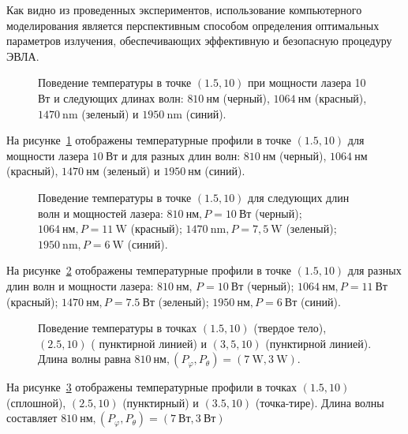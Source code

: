 Как видно из проведенных экспериментов, использование компьютерного
моделирования является перспективным способом определения оптимальных
параметров излучения, обеспечивающих эффективную и безопасную процедуру ЭВЛА.


\begin{figure}[ht]
    \caption{Поведение температуры в точке $(1.5,10)$
        при мощности лазера 10 $\mathrm{Вт}$ и следующих длинах волн:
        $810 \mathrm{~нм}$ (черный), $1064 \mathrm{~нм}$ (красный),
        $1470 \mathrm{~nm}$ (зеленый) и $1950 \mathrm{~nm}$ (синий).}
    \label{fig:4_3:4}
\end{figure}
На рисунке~\ref{fig:4_3:4} отображены температурные профили
в точке $(1.5, 10)$ для мощности лазера
$10 \mathrm{~Вт}$ и для разных длин волн: $810 \mathrm{~нм}$ (черный),
$1064 \mathrm{~нм}$ (красный), $1470 \mathrm{~нм}$
(зеленый) и $1950 \mathrm{~нм}$ (синий).

\begin{figure}[ht]
    \caption{Поведение температуры в точке $(1.5,10)$
        для следующих длин волн и мощностей лазера:
        $810 \mathrm{~нм}, P=10 \mathrm{~Вт}$ (черный);
        $1064 \mathrm{~нм}, P=11 \mathrm{~W}$ (красный);
        $1470 \mathrm{~nm}, P=7,5 \mathrm{~W}$ (зеленый);
        $1950 \mathrm{~nm}, P=6 \mathrm{~W}$ (синий).}
    \label{fig:4_3:5}
\end{figure}
На рисунке~\ref{fig:4_3:5} отображены температурные профили в точке $(1.5,10)$ для разных
длин волн и мощности лазера: $810 \mathrm{~нм}$, $P=10 \mathrm{~Вт}$
(черный); $1064 \mathrm{~нм}, P=11 \mathrm{~Вт}$ (красный);
$1470 \mathrm{~нм}, P=7.5 \mathrm{~Вт}$ (зеленый);
$1950 \mathrm{~нм}, P=6 \mathrm{~Вт}$ (синий).


\begin{figure}[ht]
    \caption{Поведение температуры в точках $(1.5,10)$ (твердое тело),
        $(2.5,10)$ ( пунктирной линией) и $(3,5,10)$ (пунктирной линией).
        Длина волны равна $810 \mathrm{~нм},\left(P_{\varphi},
        P_{\theta}\right)=(7 \mathrm{~W}, 3 \mathrm{~W})$.}
    \label{fig:4_3:6}
\end{figure}
На рисунке~\ref{fig:4_3:6} отображены температурные профили в точках $(1.5,10)$ (сплошной),
$(2.5,10)$ (пунктирный) и $(3.5,10)$ (точка-тире).
Длина волны составляет $810 \mathrm{~нм},\left(P_{\varphi},
P_{\theta}\right)=(7 \mathrm{~Вт}, 3 \mathrm{~Вт})$


